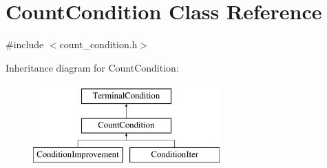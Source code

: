 \hypertarget{class_count_condition}{}\section{Count\+Condition Class Reference}
\label{class_count_condition}


{\ttfamily \#include $<$count\+\_\+condition.\+h$>$}

Inheritance diagram for Count\+Condition\+:\begin{figure}[H]
\begin{center}
\leavevmode
\includegraphics[height=3.000000cm]{class_count_condition}
\end{center}
\end{figure}
